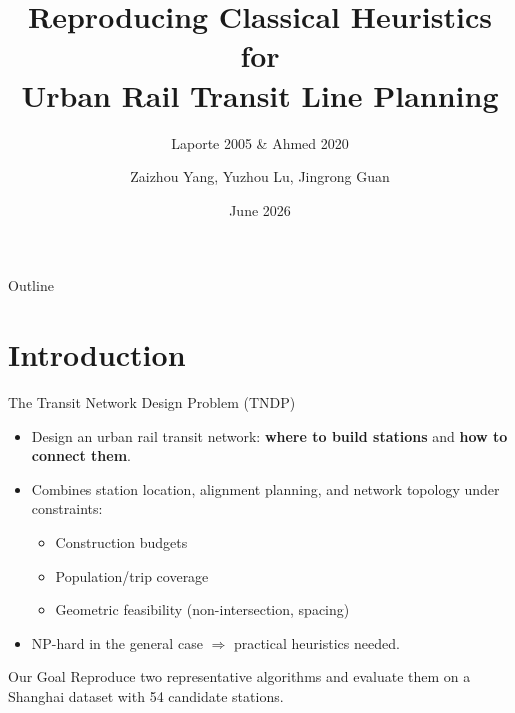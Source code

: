 \documentclass[aspectratio=169, 11pt]{beamer}
\title[Rail Line Planning]{Reproducing Classical Heuristics for\\Urban Rail Transit Line Planning}
\subtitle{Laporte 2005 \& Ahmed 2020}
\author[Yang et al.]{Zaizhou Yang, Yuzhou Lu, Jingrong Guan}
\institute[ShanghaiTech]{ShanghaiTech University\\CS240 -- Algorithm Design and Analysis}
\date{June 2026}
\begin{document}
\begin{frame}
\titlepage
\end{frame}

\begin{frame}{Outline}
\tableofcontents
\end{frame}

\section{Introduction}

\begin{frame}{The Transit Network Design Problem (TNDP)}

\begin{itemize}
    \item Design an urban rail transit network: \textbf{where to build stations} and \textbf{how to connect them}.
    \item Combines station location, alignment planning, and network topology under constraints:
    \begin{itemize}
        \item Construction budgets
        \item Population/trip coverage
        \item Geometric feasibility (non-intersection, spacing)
    \end{itemize}
    \item NP-hard in the general case \(\Rightarrow\) practical heuristics needed.
\end{itemize}

\vspace{0.3cm}
\begin{block}{Our Goal}
Reproduce two representative algorithms and evaluate them on a Shanghai dataset with 54 candidate stations.
\end{block}
\end{frame}
\end{document}
